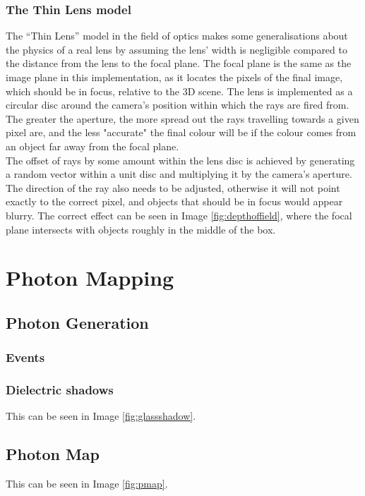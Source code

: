 \documentclass[a4paper]{article}
\begin{document}
\subsubsection{The Thin Lens model}
The ``Thin Lens'' model in the field of optics makes some generalisations about the physics of a real lens by assuming the lens' width is negligible compared to the distance from the lens to the focal plane. The focal plane is the same as the image plane in this implementation, as it locates the pixels of the final image, which should be in focus, relative to the 3D scene. The lens is implemented as a circular disc around the camera's position within which the rays are fired from. The greater the aperture, the more spread out the rays travelling towards a given pixel are, and the less "accurate" the final colour will be if the colour comes from an object far away from the focal plane.\\

The offset of rays by some amount within the lens disc is achieved by generating a random vector within a unit disc and multiplying it by the camera's aperture. The direction of the ray also needs to be adjusted, otherwise it will not point exactly to the correct pixel, and objects that should be in focus would appear blurry. The correct effect can be seen in Image \ref{fig:depthoffield}, where the focal plane intersects with objects roughly in the middle of the box.

\section{Photon Mapping}
\cite{Jensen1996photonmaps}
\subsection{Photon Generation}

\subsubsection{Events}

\subsubsection{Dielectric shadows}
This can be seen in Image \ref{fig:glassshadow}.

\subsection{Photon Map}
This can be seen in Image \ref{fig:pmap}.
\end{document}
